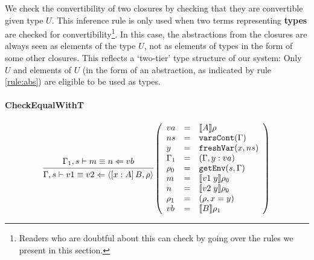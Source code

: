 \documentclass{article}
\theoremstyle{remark}
\begin{document}
We check the convertibility of two closures by checking that they are convertible given type $U$. This inference rule is only used when two terms representing \textbf{types} are checked for convertibility\footnote{Readers who are doubtful about this can check by going over the rules we present in this section.}. In this case, the abstractions from the closures are always seen as elements of the type $U$, not as elements of types in the form of some other closures. This reflects a `two-tier' type structure of our system: Only $U$ and elements of $U$ (in the form of an abstraction, as indicated by rule \ref{rule:abs}) are eligible to be used as types.

\paragraph{CheckEqualWithT}
\begin{align}
  \begin{prooftree}
    \hypo{\Gamma_1,s \vdash m \equiv n \Leftarrow vb}
    \infer1{\Gamma,s \vdash v1 \equiv v2 \Leftarrow \langle [x : A] \, B, \rho \rangle} 
  \end{prooftree}\left(\begin{array}{l l l}
                         va &= & \llbracket A \rrbracket \rho \\
                         ns &= & \texttt{varsCont}(\Gamma) \\
                         y &= & \texttt{freshVar}(x, ns) \\
                         \Gamma_1 &= & (\Gamma, y : va) \\
                         \rho_0 &= & \texttt{getEnv}(s, \Gamma) \\
                         m &= & \llbracket  v1 \; y \rrbracket \rho_0 \\
                         n &= & \llbracket v2 \; y \rrbracket \rho_0 \\
                         \rho_1 &= & (\rho, x = y) \\
                         vb &= & \llbracket B \rrbracket \rho_1 \\ 
                       \end{array}\right)
\end{align}
\end{document}
